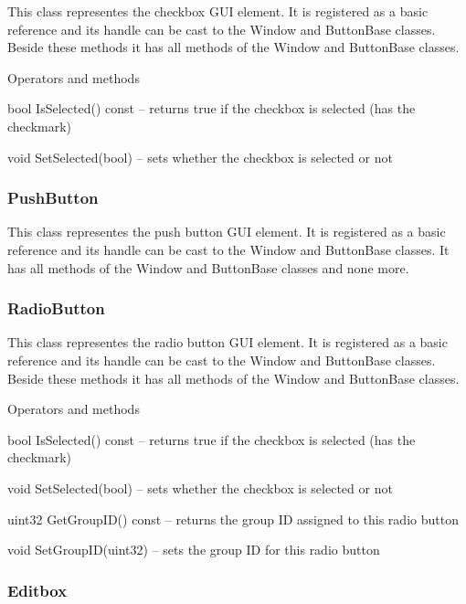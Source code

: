 This class representes the checkbox GUI element. It is registered as a basic reference and its handle can be cast to the Window and ButtonBase classes. Beside these methods it has all methods of the Window and ButtonBase classes.

\begin{titled-itemize}{Operators and methods}
  \item bool IsSelected() const -- returns true if the checkbox is selected (has the checkmark)
  \item void SetSelected(bool) -- sets whether the checkbox is selected or not
\end{titled-itemize}

\subsubsection{PushButton}

This class representes the push button GUI element. It is registered as a basic reference and its handle can be cast to the Window and ButtonBase classes. It has all methods of the Window and ButtonBase classes and none more.

\subsubsection{RadioButton}

This class representes the radio button GUI element. It is registered as a basic reference and its handle can be cast to the Window and ButtonBase classes. Beside these methods it has all methods of the Window and ButtonBase classes.

\begin{titled-itemize}{Operators and methods}
  \item bool IsSelected() const -- returns true if the checkbox is selected (has the checkmark)
  \item void SetSelected(bool) -- sets whether the checkbox is selected or not
  \item uint32 GetGroupID() const -- returns the group ID assigned to this radio button
  \item void SetGroupID(uint32) -- sets the group ID for this radio button
\end{titled-itemize}

\subsubsection{Editbox}

